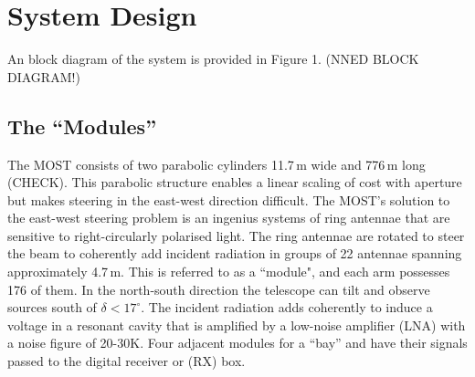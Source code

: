 \section{System Design}

An block diagram of the system is provided in Figure 1. (NNED BLOCK DIAGRAM!)

\subsection{The ``Modules''}
The MOST consists of two parabolic cylinders 11.7\,m wide and 776\,m long (CHECK). This parabolic structure enables a linear scaling of cost with aperture but makes steering in the east-west direction difficult. The MOST's solution to the east-west steering problem is an ingenius systems of ring antennae that are sensitive to right-circularly polarised light. The ring antennae are rotated to steer the beam to coherently add incident radiation in groups of 22 antennae spanning approximately 4.7\,m. This is referred to as a ``module", and each arm possesses 176 of them. In the north-south direction the telescope can tilt and observe sources south of $\delta<17^\circ$. 
The incident radiation adds coherently to induce a voltage in a resonant cavity that is amplified by a low-noise amplifier (LNA) with a noise figure of 20-30K. Four adjacent modules for a ``bay'' and have their signals passed to the digital receiver or (RX) box.
